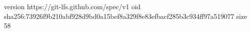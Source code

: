 version https://git-lfs.github.com/spec/v1
oid sha256:73926f9b210abf928d9bd0a15bef8a329f8e83efbacf285b3c934ff97a519077
size 58
